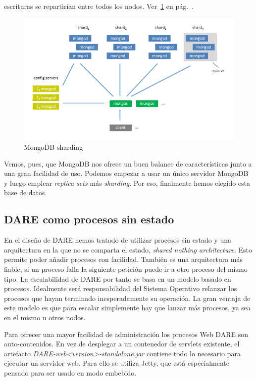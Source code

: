 \begin{description}
  escrituras se repartirían entre todos los nodos. Ver~\ref{sharding}
  en pág.~\pageref{sharding}.
  \begin{figure}[hbtp]
    \includegraphics[width=1\textwidth]{chapters/technical-manual/sharding.png}
    \caption{MongoDB sharding}\label{sharding}
  \end{figure}
\end{description}

Vemos, pues, que MongoDB nos ofrece un buen balance de características
junto a una gran facilidad de uso. Podemos empezar a usar un único
servidor MongoDB y luego emplear \emph{replica sets} más
\emph{sharding}. Por eso, finalmente hemos elegido esta base de datos.

\subsection{DARE como procesos sin estado}

En el diseño de DARE hemos tratado de utilizar procesos sin estado y
una arquitectura en la que no se comparta el estado, \emph{shared
  nothing architecture}. Esto permite poder añadir procesos con
facilidad. También es una arquitectura más fiable, si un proceso falla
la siguiente petición puede ir a otro proceso del mismo tipo. La
escalabilidad de DARE por tanto se basa en un modelo basado en
procesos. Idealmente será responsabilidad del Sistema Operativo
relanzar los procesos que hayan terminado inesperadamente su
operación. La gran ventaja de este modelo es que para escalar
simplemente hay que lanzar más procesos, ya sea en el mismo u otros
nodos.

Para ofrecer una mayor facilidad de administración los procesos Web
DARE son auto-contenidos. En vez de desplegar a un contenedor de
servlets existente, el artefacto
\emph{DARE-web<version>-standalone.jar} contiene todo lo necesario
para ejecutar un servidor web. Para ello se utiliza Jetty, que está
especialmente pensado para ser usado en modo embebido.

